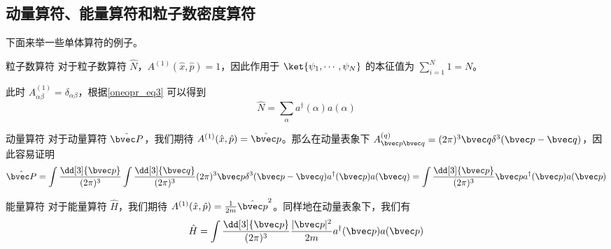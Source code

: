 \subsection{动量算符、能量算符和粒子数密度算符}
下面来举一些单体算符的例子。
\begin{example}{粒子数算符}
对于粒子数算符 $\hat N$，$A^{(1)}(\hat x,\hat p)=1$，因此作用于 $\ket{\psi_1,\cdots,\psi_N}$ 的本征值为 $\sum_{i=1}^N 1=N$。

此时 $A_{\alpha\beta}^{(1)}=\delta_{\alpha\beta}$，根据\autoref{oneopr_eq3} 可以得到
\begin{equation}
\hat N=\sum_{\alpha} a^\dagger(\alpha) a(\alpha)
\end{equation}
\begin{exercise}{动量算符}
对于动量算符 $\hat{\bvec P}$，我们期待 $A^{(1)}(\hat x,\hat p)=\hat{\bvec p}$。那么在动量表象下 $A_{\bvec p\bvec q}^{(q)}=(2\pi)^3 \bvec q \delta^3(\bvec p-\bvec q)$，因此容易证明
\begin{equation}
\begin{aligned}
\hat{\bvec P}=\int\frac{\dd[3]{\bvec p}}{(2\pi)^3} \int\frac{\dd[3]{\bvec q}}{(2\pi)^3} (2\pi)^3 \bvec p \delta^3(\bvec p-\bvec q)a^\dagger(\bvec p)a(\bvec q)=\int\frac{\dd[3]{\bvec p}}{(2\pi)^3} \bvec p a^\dagger(\bvec p)a(\bvec p)
\end{aligned}
\end{equation}
\end{exercise}

\begin{exercise}{能量算符}
对于能量算符 $\hat H$，我们期待 $A^{(1)}(\hat x,\hat p)=\frac{1}{2m}\hat{\bvec p}^2$。同样地在动量表象下，我们有
\begin{equation}
\begin{aligned}
\hat{H}=\int\frac{\dd[3]{\bvec p}}{(2\pi)^3} \frac{|\bvec p|^2}{2m} a^\dagger(\bvec p)a(\bvec p)
\end{aligned}
\end{equation}
\end{exercise}
\end{example}